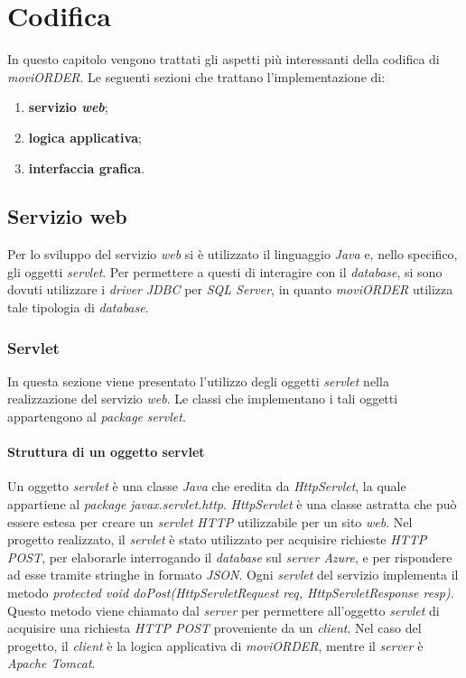\chapter{Codifica} \label{codifica}

In questo capitolo vengono trattati gli aspetti più interessanti della codifica di \textit{moviORDER}. Le seguenti sezioni che trattano l'implementazione di:
\begin{enumerate}
	\item \textbf{servizio \textit{web}};
	\item \textbf{logica applicativa};
	\item \textbf{interfaccia grafica}.
\end{enumerate}

\section{Servizio web} \label{codificaservizio}

Per lo sviluppo del servizio \textit{web} si è utilizzato il linguaggio \textit{Java} e, nello specifico, gli oggetti \textit{servlet}. Per permettere a questi di interagire con il \textit{database}, si sono dovuti utilizzare i \textit{driver} \textit{JDBC} per \textit{SQL Server}, in quanto \textit{moviORDER} utilizza tale tipologia di \textit{database}. 

\subsection{Servlet}

In questa sezione viene presentato l'utilizzo degli oggetti \textit{servlet} nella realizzazione del servizio \textit{web}. Le classi che implementano i tali oggetti appartengono al \textit{package} \textit{servlet}.

\subsubsection{Struttura di un oggetto servlet}

Un oggetto \textit{servlet} è una classe \textit{Java} che eredita da \textit{HttpServlet}, la quale appartiene al \textit{package} \textit{javax.servlet.http}. \textit{HttpServlet} è una classe astratta che può essere estesa per creare un \textit{servlet} \textit{HTTP} utilizzabile per un sito \textit{web}. Nel progetto realizzato, il \textit{servlet} è stato utilizzato per acquisire richieste \textit{HTTP POST}, per elaborarle interrogando il \textit{database} sul \textit{server Azure}, e per rispondere ad esse tramite stringhe in formato \textit{JSON}. Ogni \textit{servlet} del servizio implementa il metodo \textit{protected void doPost(HttpServletRequest req, HttpServletResponse resp)}. Questo metodo viene chiamato dal \textit{server} per permettere all'oggetto \textit{servlet} di acquisire una richiesta \textit{HTTP POST} proveniente da un \textit{client}. Nel caso del progetto, il \textit{client} è la logica applicativa di \textit{moviORDER}, mentre il \textit{server} è \textit{Apache Tomcat}.

